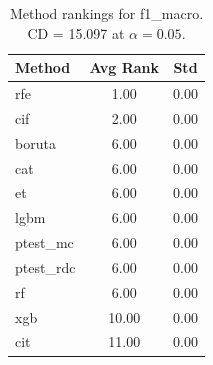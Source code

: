 \begin{table}[h]
\centering
\caption{Method rankings for f1_macro. CD = 15.097 at $\alpha=0.05$.}
\label{tab:ranks_f1_macro}
\begin{tabular}{lcc}
\toprule
Method & Avg Rank & Std \\
\midrule
rfe & 1.00 & 0.00 \\
cif & 2.00 & 0.00 \\
boruta & 6.00 & 0.00 \\
cat & 6.00 & 0.00 \\
et & 6.00 & 0.00 \\
lgbm & 6.00 & 0.00 \\
ptest_mc & 6.00 & 0.00 \\
ptest_rdc & 6.00 & 0.00 \\
rf & 6.00 & 0.00 \\
xgb & 10.00 & 0.00 \\
cit & 11.00 & 0.00 \\
\bottomrule
\end{tabular}
\end{table}